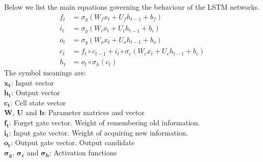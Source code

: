 \documentclass[12pt]{article}
\begin{document}
				Below we list the main equations governing the behaviour of the LSTM networks.\\
				\begin{align}
					f_{t} &= \sigma_{g}(W_{f}x_{t} + U_{f}h_{t-1} + b_{f})\\	
					i_{t} &= \sigma_{g}(W_{i}x_{t} + U_{i}h_{t-1} + b_{i})\\
					o_{t} &= \sigma_{g}(W_{o}x_{t} + U_{o}h_{t-1} + b_{o})\\
					c_{t} &= f_{t} \circ c_{t-1} + i_{t} \circ \sigma_{c}(W_{c}x_{t} + U_{c}h_{t-1} + b_{c})\\
					h_{t} &= o_{t} \circ \sigma_{h}(c_{t})
				\end{align}
				The symbol meanings are:\\
	$\mathbf{x_{t}}$: Input vector\\
    $\mathbf{h_{t}}$: Output vector\\
    $\mathbf{c_{t}}$: Cell state vector\\
    $\mathbf{W}$, $\mathbf{U}$ and $\mathbf{b}$: Parameter matrices and vector\\
    $\mathbf{f_{t}}$: Forget gate vector. Weight of remembering old information.\\
    $\mathbf{i_{t}}$: Input gate vector. Weight of acquiring new information.\\
    $\mathbf{o_{t}}$: Output gate vector. Output candidate\\
    $\mathbf{\sigma_{g}}$, $\mathbf{\sigma_{c}}$ and $\mathbf{\sigma_{h}}$: Activation functions\\
		
\end{document}
